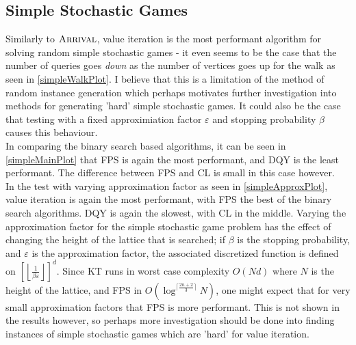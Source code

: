 \subsection{Simple Stochastic Games}
Similarly to $\textsc{Arrival}$, value iteration is the most performant algorithm for solving
random simple stochastic games - it even seems to be the case
that the number of queries goes \emph{down} as the number of vertices
goes up for the walk as seen in \cref{simpleWalkPlot}. 
I believe that this is a limitation of the method
of random instance generation which perhaps motivates further investigation
into methods for generating 'hard' simple stochastic games. It could also
be the case that testing with a fixed approximiation factor $\varepsilon$
and stopping probability $\beta$ causes this behaviour. \\
In comparing the binary search based algorithms, it can be seen in \cref{simpleMainPlot} 
that
FPS is again the most performant, and DQY is the least performant. The difference
between FPS and CL is small in this case however. \\
In the test with varying approximation factor as seen in \cref{simpleApproxPlot}, value iteration 
is again the most performant, with FPS the best of the binary search algorithms.
DQY is again the slowest, with CL in the middle. Varying the approximation factor
for the simple stochastic game problem has the effect of changing the height of the lattice
that is searched; if $\beta$ is the stopping probability, and $\varepsilon$ is the approximation
factor, the associated discretized function is 
defined on $\left[\left \lfloor \frac{1}{\beta \varepsilon}\right \rfloor\right]^d$.
Since KT runs in worst case complexity $O(Nd)$ where $N$ is the height of the lattice,
and FPS in $O(\log^{\lceil \frac{2n + 2}{3} \rceil} N)$, one might expect that for
very small approximation factors that FPS is more performant. This is not shown in
the results however, so perhaps more investigation should be done into finding
instances of simple stochastic games which are 'hard' for value iteration.

